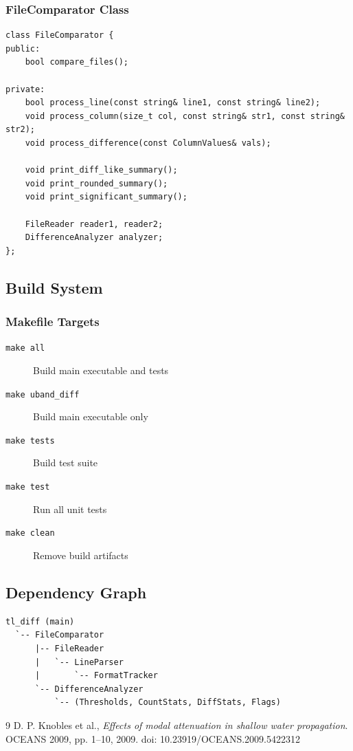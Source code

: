 \documentclass[11pt,letterpaper]{article}
\begin{document}
\subsubsection{FileComparator Class}

\begin{verbatim}
class FileComparator {
public:
    bool compare_files();

private:
    bool process_line(const string& line1, const string& line2);
    void process_column(size_t col, const string& str1, const string& str2);
    void process_difference(const ColumnValues& vals);

    void print_diff_like_summary();
    void print_rounded_summary();
    void print_significant_summary();

    FileReader reader1, reader2;
    DifferenceAnalyzer analyzer;
};
\end{verbatim}

\subsection{Build System}

\subsubsection{Makefile Targets}

\begin{description}
    \item[\texttt{make all}] Build main executable and tests
    \item[\texttt{make uband\_diff}] Build main executable only
    \item[\texttt{make tests}] Build test suite
    \item[\texttt{make test}] Run all unit tests
    \item[\texttt{make clean}] Remove build artifacts
\end{description}

\subsection{Dependency Graph}

\begin{verbatim}
tl_diff (main)
  `-- FileComparator
      |-- FileReader
      |   `-- LineParser
      |       `-- FormatTracker
      `-- DifferenceAnalyzer
          `-- (Thresholds, CountStats, DiffStats, Flags)
\end{verbatim}

\begin{thebibliography}{9}
D. P. Knobles et al.,
\emph{Effects of modal attenuation in shallow water propagation}.
OCEANS 2009, pp. 1--10, 2009.
doi: 10.23919/OCEANS.2009.5422312
\end{thebibliography}



\end{document}
